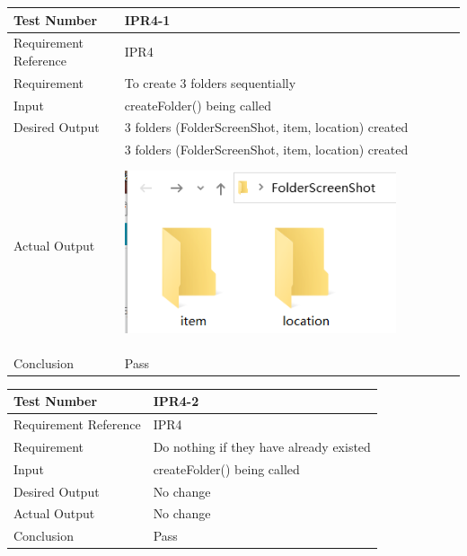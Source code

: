 \documentclass[12pt, titlepage]{article}
\begin{document}
\begin{table}[H]
\begin{center}
\begin{tabular}{|l | m{9cm}|}
\hline
  Test Number & IPR4-1\\
  \hline
  Requirement Reference & IPR4\\
  \hline
  Requirement &  To create 3 folders sequentially\\
  \hline
  Input & createFolder() being called\\
  \hline
  Desired Output & 3 folders (FolderScreenShot, item, location) created\\
  \hline
  Actual Output & 3 folders (FolderScreenShot, item, location) created\includegraphics[width=80mm, height=55mm]{UT1.png}\\
  \hline
  Conclusion & Pass\\
  \hline
\end{tabular}
\end{center}           
\end{table}
\begin{table}[H]
\begin{center}
\begin{tabular}{|l | m{9cm}|}
\hline
  Test Number & IPR4-2\\
  \hline
  Requirement Reference & IPR4\\
  \hline
  Requirement &  Do nothing if they have already existed\\
  \hline
  Input & createFolder() being called\\
  \hline
  Desired Output & No change\\
  \hline
  Actual Output & No change\\
  \hline
  Conclusion & Pass\\
  \hline
\end{tabular}
\end{center}           
\end{table}
\end{document}
